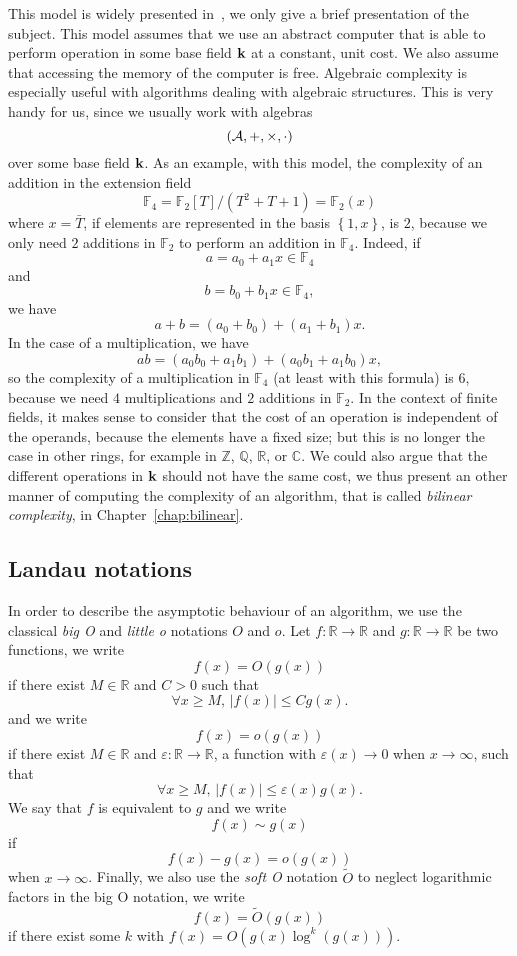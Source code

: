 This model is widely presented in~\cite{BCS13}, we only give a brief
presentation of the subject. This model assumes that we use an abstract computer
that is able to perform operation in some base field $\mathbf{k}$ at a constant, unit
cost. We also assume that accessing the memory of the computer is free.
Algebraic complexity is especially useful with algorithms dealing with
algebraic structures. This is very handy for us, since
we usually work with algebras
\[
  (\mathcal{A}, +, \times, \cdot)
\]
over some base field $\mathbf{k}$. As an example, with this model, the complexity of an
addition in the extension field
\[
  \mathbb{F}_4 = \mathbb{F}_2[T]/(T^2+T+1) = \mathbb{F}_2(x)
\]
where $x=\bar T$, if elements are represented in the basis $\left\{ 1, x
\right\}$, is $2$, because we only need $2$ additions in $\mathbb{F}_2$ to
perform an addition in $\mathbb{F}_4$. Indeed, if
\[
  a = a_0 + a_1x\in\mathbb{F}_4
\]
and
\[
  b = b_0 + b_1x\in\mathbb{F}_4,
\]
we have
\[
  a+b = (a_0+b_0)+(a_1+b_1)x.
\]
In the case of a multiplication, we have
\[
  ab = (a_0b_0+a_1b_1) + (a_0b_1+a_1b_0)x,
\]
so the complexity of a multiplication in $\mathbb{F}_4$ (at least with this
formula) is $6$, because we need
$4$ multiplications and $2$ additions in $\mathbb{F}_2$. In the context of
finite fields, it makes sense to consider that the cost of an operation is
independent of the operands, because the elements have a fixed size; but this is
no longer the case in other rings, for example in $\mathbb{Z}$, $\mathbb{Q}$,
$\mathbb{R}$, or $\mathbb{C}$. We could also argue that the different operations
in $\mathbf{k}$ should not have the same cost, we thus present an other manner of
computing the complexity of an algorithm, that is called \emph{bilinear
complexity}, in Chapter~\ref{chap:bilinear}.

\subsection{Landau notations}

In order to describe the asymptotic behaviour of an algorithm, we use the
classical \emph{big O} and \emph{little o} notations $O$ and $o$. Let $f:\mathbb{R}\to\mathbb{R}$ and
$g:\mathbb{R}\to\mathbb{R}$ be two functions, we write
\[
  f(x) = O(g(x))
\]
if there exist $M\in\mathbb{R}$ and $C>0$ such that
\[
  \forall x\geq M,\,|f(x)|\leq Cg(x).
\]
and we write
\[
  f(x)=o(g(x))
\]
if there exist $M\in\mathbb{R}$ and $\varepsilon:\mathbb{R}\to\mathbb{R}$, a
function with $\varepsilon(x)\to 0$ when $x\to\infty$, such
that
\[
  \forall x\geq M,\,|f(x)|\leq \varepsilon(x)g(x).
\]
We say that $f$ is equivalent to $g$ and we write
\[
  f(x)\sim g(x)
\]
if 
\[
 f(x)-g(x) = o(g(x))
\]
when $x\to\infty$. Finally, we also use the \emph{soft O} notation $\tilde{O}$ to neglect
logarithmic factors in the big O notation, we write
\[
  f(x) = \tilde{O}(g(x))
\]
if there exist some $k$ with $f(x) = O(g(x)\log^k(g(x)))$.

